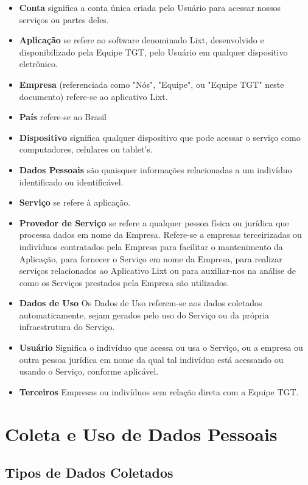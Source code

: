 \begin{itemize}
	\item \textbf{Conta} significa a conta única criada pelo Usuário para acessar nossos serviços ou partes deles.
	\item \textbf{Aplicação} se refere ao software denominado Lixt, desenvolvido e disponibilizado pela Equipe TGT, pelo Usuário em qualquer dispositivo eletrônico.
	\item \textbf{Empresa} (referenciada como "Nós", "Equipe", ou "Equipe TGT" neste documento) refere-se ao aplicativo Lixt.
	\item \textbf{País} refere-se ao Brasil
	\item \textbf{Dispositivo} significa qualquer dispositivo que pode acessar o serviço como computadores, celulares ou tablet's.
	\item \textbf{Dados Pessoais} são quaisquer informações relacionadas a um indivíduo identificado ou identificável.
	\item \textbf{Serviço} se refere à aplicação.
	\item \textbf{Provedor de Serviço} se refere a qualquer pessoa física ou jurídica que processa dados em nome da Empresa. Refere-se a empresas terceirizadas ou indivíduos contratados pela Empresa para facilitar o mantenimento da Aplicação, para fornecer o Serviço em nome da Empresa, para realizar serviços relacionados ao Aplicativo Lixt ou para auxiliar-nos na análise de como os Serviços prestados pela Empresa são utilizados.
	\item \textbf{Dados de Uso} Os Dados de Uso referem-se aos dados coletados automaticamente, sejam gerados pelo uso do Serviço ou da própria infraestrutura do Serviço.
	\item \textbf{Usuário} Significa o indivíduo que acessa ou usa o Serviço, ou a empresa ou outra pessoa jurídica em nome da qual tal indivíduo está acessando ou usando o Serviço, conforme aplicável.
	\item \textbf{Terceiros} Empresas ou indivíduos sem relação direta com a Equipe TGT.
\end{itemize}

\section{Coleta e Uso de Dados Pessoais}
\subsection{Tipos de Dados Coletados}

